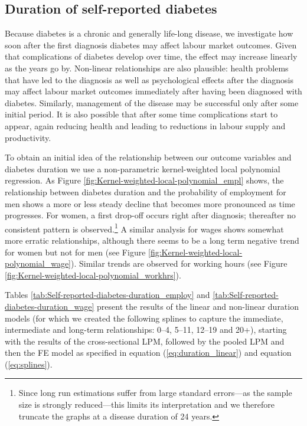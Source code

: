 \subsection{\label{sec:duration}Duration of self-reported  diabetes }

Because diabetes is a chronic and generally life-long disease, we investigate how soon after the first diagnosis diabetes may affect labour market outcomes. Given that complications of diabetes develop over time, the effect may increase linearly as the years go by. Non-linear relationships are also plausible: health problems that have led to the diagnosis as well as psychological effects after the diagnosis may affect labour market outcomes immediately after having been diagnosed with diabetes. Similarly, management of the disease may be successful only after some initial period. It is also possible that after some time complications start to appear, again reducing health and leading to reductions in labour supply and productivity.


To obtain an initial idea of the relationship between our outcome variables and diabetes duration we use a non-parametric kernel-weighted local polynomial regression. As Figure \ref{fig:Kernel-weighted-local-polynomial_empl} shows, the relationship between diabetes duration and the probability of employment for men shows a more or less steady decline that becomes more pronounced as time progresses. For women,
a first drop-off occurs right after diagnosis; thereafter no consistent pattern is observed.\footnote{Since long run estimations suffer from large standard errors---as the sample size is strongly reduced---this limits its interpretation and we therefore truncate the graphs at a disease duration of 24 years.} A similar analysis for wages shows somewhat more erratic relationships, although there seems to be a long term negative trend for women but not for men (see Figure \ref{fig:Kernel-weighted-local-polynomial_wage}).  Similar trends are observed for working hours (see Figure \ref{fig:Kernel-weighted-local-polynomial_workhrs}).

Tables \ref{tab:Self-reported-diabetes-duration_employ} and  \ref{tab:Self-reported-diabetes-duration_wage} present the results of the linear and non-linear duration models (for which we created the following splines to capture the immediate, intermediate and long-term relationships: 0--4,
5--11, 12--19 and 20+), starting with the results of the cross-sectional \ac{LPM}, followed by the pooled \ac{LPM} and then the \ac{FE} model as specified in equation (\ref{eq:duration_linear}) and equation (\ref{eq:splines}).

